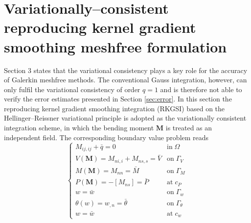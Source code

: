 \section{Variationally--consistent reproducing kernel gradient smoothing meshfree formulation}\label{sec:rkgs}

Section 3 states that the variational consistency plays a key role for the accuracy of Galerkin meshfree methods.
The conventional Gauss integration, however, can only fulfil the variational consistency of order $q=1$ and is therefore not able to verify the error estimates presented in Section \ref{sec:error}.
In this section the reproducing kernel gradient smoothing integration (RKGSI) \cite{} based on the Hellinger--Reissner variational principle \cite{} is adopted as the variationally consistent integration scheme, in which the bending moment $\boldsymbol M$ is treated as an independent field.
The corresponding boundary value problem reads
\begin{equation}\label{hr_strong}
	\begin{cases}
		M_{ij,ij}+\bar q=0 & \text{in}\;\Omega\\
		V(\boldsymbol M)=M_{ni,i}+M_{ns,s}=\bar V & \text{on}\;\Gamma_{V}\\
		M(\boldsymbol M)=M_{nn}=\bar M & \text{on}\;\Gamma_{M}\\
		P(\boldsymbol M)=-\left[M_{ns}\right]=\bar P & \text{at}\;c_P\\
		w=\bar w & \text{on}\;\Gamma_{w}\\
		\theta(w)=w_{,n}=\bar\theta & \text{on}\;\Gamma_{\theta}\\
		w=\bar w & \text{at}\;c_w
	\end{cases}
\end{equation}

